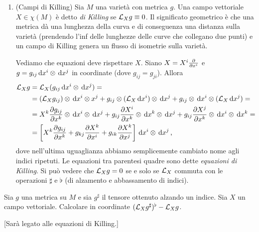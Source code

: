 \begin{example}
\begin{enumerate}

		
		\item (Campi di Killing) Sia $M$ una varietà con metrica $g$. Una campo vettoriale $X\in\chi(M)$ è detto \emph{di Killing} se $\mathcal L_Xg \equiv 0$. Il significato geometrico è che una metrica dà una lunghezza della curva e di conseguenza una distanza sulla varietà (prendendo l'inf delle lunghezze delle curve che collegano due punti) e un campo di Killing genera un flusso di isometrie sulla varietà. %
		
		Vediamo che equazioni deve rispettare $X$. Siano $X = X^i\frac{\partial }{\partial x^i}$ e $g = g_{ij}\,\mathrm d x^i \otimes \,\mathrm d x^j$ in coordinate (dove $g_{ij} = g_{ji}$).
		Allora
		\begin{align*}
		\mathcal L_Xg &= \mathcal L_X (g_{ij}\,\mathrm d x^i \otimes \,\mathrm d x^j) =\\
		&=(\mathcal L_Xg_{ij})\otimes \,\mathrm d x^i\otimes x^j + g_{ij} \otimes (\mathcal L_X\,\mathrm d x^i) \otimes \,\mathrm d x^j + g_{ij}\otimes \,\mathrm d x^i \otimes (\mathcal L_X\,\mathrm d x^j) =\\
		&= X^k \frac{\partial g_{ij}}{\partial x^k}\otimes \,\mathrm d x^i \otimes \,\mathrm d x^j + g_{ij}\frac{\partial X^i}{\partial x^k} \otimes \,\mathrm d x^k \otimes \,\mathrm d x^j + g_{ij} \frac{\partial X^j}{\partial x^k} \otimes \,\mathrm d x^i \otimes \,\mathrm d x^k =\\
		&= \left[X^k \frac{\partial g_{ij}}{\partial x^k} + g_{kj} \frac{\partial X^k}{\partial x^i} + g_{ik} \frac{\partial X^k}{\partial x^j} \right] \,\mathrm d x^i \otimes \,\mathrm d x^j \, \text{, }
		\end{align*}
		dove nell'ultima uguaglianza abbiamo semplicemente cambiato nome agli indici ripetuti. Le equazioni tra parentesi quadre sono dette \emph{equazioni di Killing}. Si può vedere che $\mathcal L_Xg=0$ se e solo se $\mathcal L_X$ commuta con le operazioni $\sharp$ e $\flat$ (di alzamento e abbassamento di indici).
	\end{enumerate}
\end{example}

\begin{exercise}
	Sia $g$ una metrica su $M$ e sia $g^{\sharp}$ il tensore ottenuto alzando un indice. Sia $X$ un campo vettoriale. Calcolare in coordinate $(\mathcal L_X g^\sharp)^\flat - \mathcal L_X g$.
	
	[Sarà legato alle equazioni di Killing.]
\end{exercise}

